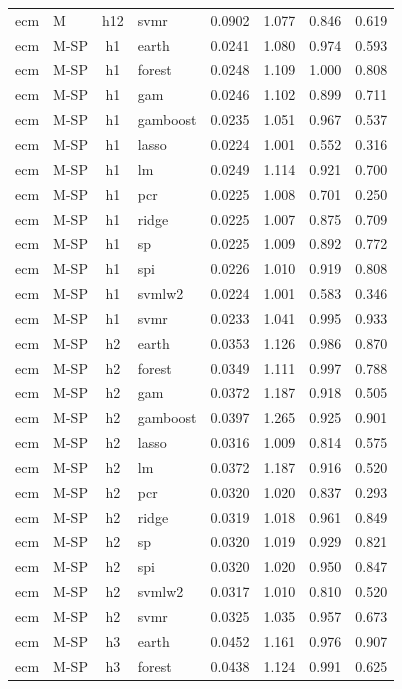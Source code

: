\begin{ThreePartTable}
\begin{longtable}[t]{llclcccc}
ecm & M & h12 & svmr & 0.0902 & 1.077 & 0.846 & 0.619\\
\addlinespace
ecm & M-SP & h1 & earth & 0.0241 & 1.080 & 0.974 & 0.593\\
ecm & M-SP & h1 & forest & 0.0248 & 1.109 & 1.000 & 0.808\\
ecm & M-SP & h1 & gam & 0.0246 & 1.102 & 0.899 & 0.711\\
ecm & M-SP & h1 & gamboost & 0.0235 & 1.051 & 0.967 & 0.537\\
ecm & M-SP & h1 & lasso & 0.0224 & 1.001 & 0.552 & 0.316\\
ecm & M-SP & h1 & lm & 0.0249 & 1.114 & 0.921 & 0.700\\
ecm & M-SP & h1 & pcr & 0.0225 & 1.008 & 0.701 & 0.250\\
ecm & M-SP & h1 & ridge & 0.0225 & 1.007 & 0.875 & 0.709\\
ecm & M-SP & h1 & sp & 0.0225 & 1.009 & 0.892 & 0.772\\
ecm & M-SP & h1 & spi & 0.0226 & 1.010 & 0.919 & 0.808\\
ecm & M-SP & h1 & svmlw2 & 0.0224 & 1.001 & 0.583 & 0.346\\
ecm & M-SP & h1 & svmr & 0.0233 & 1.041 & 0.995 & 0.933\\
\addlinespace
ecm & M-SP & h2 & earth & 0.0353 & 1.126 & 0.986 & 0.870\\
ecm & M-SP & h2 & forest & 0.0349 & 1.111 & 0.997 & 0.788\\
ecm & M-SP & h2 & gam & 0.0372 & 1.187 & 0.918 & 0.505\\
ecm & M-SP & h2 & gamboost & 0.0397 & 1.265 & 0.925 & 0.901\\
ecm & M-SP & h2 & lasso & 0.0316 & 1.009 & 0.814 & 0.575\\
ecm & M-SP & h2 & lm & 0.0372 & 1.187 & 0.916 & 0.520\\
ecm & M-SP & h2 & pcr & 0.0320 & 1.020 & 0.837 & 0.293\\
ecm & M-SP & h2 & ridge & 0.0319 & 1.018 & 0.961 & 0.849\\
ecm & M-SP & h2 & sp & 0.0320 & 1.019 & 0.929 & 0.821\\
ecm & M-SP & h2 & spi & 0.0320 & 1.020 & 0.950 & 0.847\\
ecm & M-SP & h2 & svmlw2 & 0.0317 & 1.010 & 0.810 & 0.520\\
ecm & M-SP & h2 & svmr & 0.0325 & 1.035 & 0.957 & 0.673\\
\addlinespace
ecm & M-SP & h3 & earth & 0.0452 & 1.161 & 0.976 & 0.907\\
ecm & M-SP & h3 & forest & 0.0438 & 1.124 & 0.991 & 0.625\\

\end{longtable}
\end{ThreePartTable}
